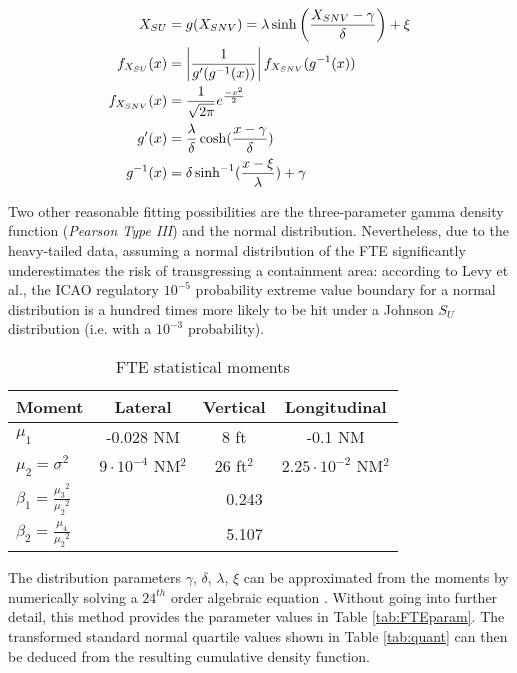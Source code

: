 \documentclass[conference]{IEEEtran}
\begin{document}
\begin{align}
X_{SU}&=g(X_{SNV})=\lambda\sinh\left(\frac{X_{SNV}-\gamma}{\delta}\right)+\xi \label{eqn:JohnsonSU}\\
f_{X_{SU}}(x)&=\left|\frac{1}{g'(g^{-1}(x))}\right|f_{X_{SNV}}(g^{-1}(x))\label{eqn:JSUdensity}\\
f_{X_{SNV}}(x)&=\frac{1}{\sqrt{2\pi}}e^{\frac{-x^2}{2}} \notag\\
g'(x)&=\frac{\lambda}{\delta}\cosh(\frac{x-\gamma}{\delta}) \notag \\
g^{-1}(x)&=\delta\sinh^{-1}(\frac{x-\xi}{\lambda})+\gamma\notag
\end{align}

Two other reasonable fitting possibilities are the three-parameter gamma density function (\emph{Pearson Type III}) and the normal distribution. Nevertheless, due to the heavy-tailed data, assuming a normal distribution of the FTE significantly underestimates the risk of transgressing a containment area: according to Levy et al., the ICAO regulatory $10^{-5}$ probability extreme value boundary for a normal distribution is a hundred times more likely to be hit under a Johnson $S_U$ distribution (i.e. with a $10^{-3}$ probability).

\begin{table}
\caption{FTE statistical  moments}
\label{tab:FTEfit}
\centering
\begin{tabular}{|l|c|c|c|}
\hline\hline
Moment & Lateral & Vertical & Longitudinal \bigstrut\\ \hline\hline
$\mu_1$& -0.028 NM & 8 ft & -0.1 NM  \bigstrut \\ \hline
$\mu_2=\sigma^2$ & $9\cdot10^{-4}$ NM$^2$ & 26 ft$^2$ & $2.25\cdot 10^{-2}$ NM$^2$ \bigstrut \\ \hline
$\beta_1=\displaystyle\frac{{\mu_3}^2}{{\mu_2}^2}$ & \multicolumn{3}{c|}{0.243} \bigstrut \\ \hline
$\beta_2=\displaystyle\frac{\mu_4}{{\mu_2}^2}$ & \multicolumn{3}{c|}{5.107} \bigstrut\\ \hline\hline
\end{tabular}
\end{table}

The distribution parameters $\gamma$, $\delta$, $\lambda$, $\xi$ can be approximated from the moments by numerically solving a $24^{th}$ order algebraic equation \cite{Win78}. Without going into further detail, this method provides the parameter values in Table \ref{tab:FTEparam}. The transformed standard normal quartile values shown in Table \ref{tab:quant} can then be deduced from the resulting cumulative density function.
\end{document}
